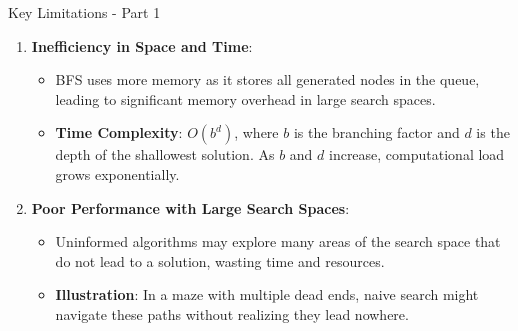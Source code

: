 \documentclass[aspectratio=169]{beamer}
\begin{document}
\begin{frame}[fragile]{Key Limitations - Part 1}
    \begin{enumerate}
        \item \textbf{Inefficiency in Space and Time}:
        \begin{itemize}
            \item BFS uses more memory as it stores all generated nodes in the queue, leading to significant memory overhead in large search spaces.
            \item \textbf{Time Complexity}: $O(b^d)$, where $b$ is the branching factor and $d$ is the depth of the shallowest solution. As $b$ and $d$ increase, computational load grows exponentially.
        \end{itemize}
        
        \item \textbf{Poor Performance with Large Search Spaces}:
        \begin{itemize}
            \item Uninformed algorithms may explore many areas of the search space that do not lead to a solution, wasting time and resources.
            \item \textbf{Illustration}: In a maze with multiple dead ends, naive search might navigate these paths without realizing they lead nowhere.
        \end{itemize}
    \end{enumerate}
\end{frame}
\end{document}
